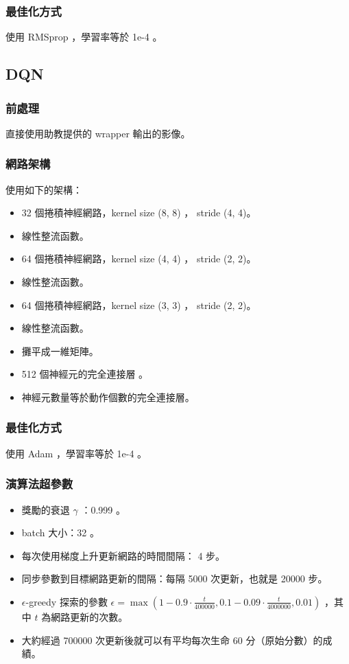 \documentclass[fleqn,a4paper,12pt]{article}
\begin{document}
\subsubsection*{最佳化方式}

使用 RMSprop ，學習率等於 1e-4 。

\subsection{DQN}

\subsubsection*{前處理}

直接使用助教提供的 wrapper 輸出的影像。

\subsubsection*{網路架構}

使用如下的架構：

\begin{itemize}
\item 32 個捲積神經網路，kernel size (8, 8) ， stride (4, 4)。
\item 線性整流函數。
\item 64 個捲積神經網路，kernel size (4, 4) ， stride (2, 2)。
\item 線性整流函數。
\item 64 個捲積神經網路，kernel size (3, 3) ， stride (2, 2)。
\item 線性整流函數。
\item 攤平成一維矩陣。
\item 512 個神經元的完全連接層 。
\item 神經元數量等於動作個數的完全連接層。
\end{itemize}

\subsubsection*{最佳化方式}

使用 Adam ，學習率等於 1e-4 。

\subsubsection*{演算法超參數}

\begin{itemize}
\item 獎勵的衰退 $\gamma$ ：0.999 。
\item batch 大小：32 。
\item 每次使用梯度上升更新網路的時間間隔： 4 步。
\item 同步參數到目標網路更新的間隔：每隔 5000 次更新，也就是 20000 步。
\item $\epsilon$-greedy 探索的參數 $\epsilon = \max(1 -  0.9 \cdot \frac{t}{400000}, 0.1 - 0.09 \cdot \frac{t}{4000000}, 0.01)$ ，其中 $t$ 為網路更新的次數。
\item 大約經過 700000 次更新後就可以有平均每次生命 60 分（原始分數）的成績。
\end{itemize}
\end{document}
